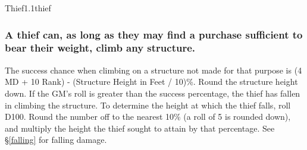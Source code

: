 \begin{skill}{Thief}{1.1}{thief}

\subsubsection{A thief can, as long as they may find a purchase
sufficient to bear their weight, climb any structure.}


The success chance when climbing on a structure not made for that
purpose is (4 \x MD + 10 \x Rank) - (Structure Height in Feet / 10)\%.
Round the structure height down.  If the GM's roll is greater than the
success percentage, the thief has fallen in climbing the structure.
To determine the height at which the thief falls, roll D100.  Round
the number off to the nearest 10\% (a roll of 5 is rounded down), and
multiply the height the thief sought to attain by that percentage.
See \S\ref{falling} for falling damage.

\end{skill}